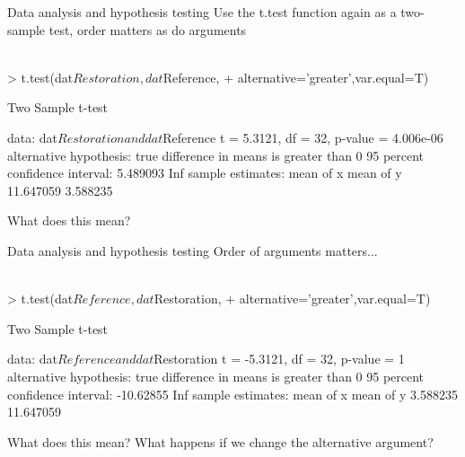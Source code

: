 \documentclass[xcolor=svgnames]{beamer}
\begin{document}
\begin{frame}[fragile]{Data analysis and hypothesis testing}
Use the t.test function again as a two-sample test, order matters as do arguments\\~\\
\begin{Schunk}
\begin{Sinput}
> t.test(dat$Restoration,dat$Reference,
+ 	alternative='greater',var.equal=T)
\end{Sinput}
\end{Schunk}
\small
\begin{Schunk}
\begin{Soutput}
	Two Sample t-test

data:  dat$Restoration and dat$Reference
t = 5.3121, df = 32, p-value = 4.006e-06
alternative hypothesis: true difference in means is greater than 0
95 percent confidence interval:
 5.489093      Inf
sample estimates:
mean of x mean of y 
11.647059  3.588235 
\end{Soutput}
\end{Schunk}
\normalsize
What does this mean?
\end{frame}

\begin{frame}[fragile]{Data analysis and hypothesis testing}
Order of arguments matters...\\~\\
\begin{Schunk}
\begin{Sinput}
> t.test(dat$Reference,dat$Restoration,
+ 	alternative='greater',var.equal=T)
\end{Sinput}
\end{Schunk}
\small
\begin{Schunk}
\begin{Soutput}
	Two Sample t-test

data:  dat$Reference and dat$Restoration
t = -5.3121, df = 32, p-value = 1
alternative hypothesis: true difference in means is greater than 0
95 percent confidence interval:
 -10.62855       Inf
sample estimates:
mean of x mean of y 
 3.588235 11.647059 
\end{Soutput}
\end{Schunk}
\normalsize
What does this mean? What happens if we change the alternative argument?
\end{frame}
\end{document}
